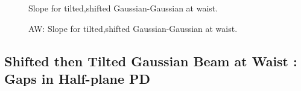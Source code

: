 \documentclass[aps,twoside,secnumarabic,balancelastpage,amsmath,amssymb,nofootinbib,hyperref=pdftex]{revtex4}
\begin{document}
	\begin{figure}
	\centering
	\caption{Slope for tilted,shifted Gaussian-Gaussian at waist.}
	\label{fig:18}
	\end{figure}
	

	\begin{figure}
	\centering
	\caption{AW: Slope for tilted,shifted Gaussian-Gaussian at waist.}
	\label{fig:19}
	\end{figure}
\clearpage



\subsection{Shifted then Tilted Gaussian Beam at Waist : Gaps in Half-plane PD}
\end{document}
